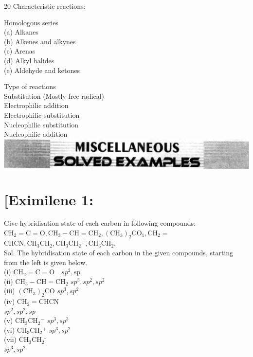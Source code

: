 \documentclass[10pt]{article}
\begin{document}
20 Characteristic reactions:

Homologous series\\
(a) Alkanes\\
(b) Alkenes and alkynes\\
(c) Arenas\\
(d) Alkyl halides\\
(e) Aldehyde and ketones

Type of reactions\\
Substitution (Mostly free radical)\\
Electrophilic addition\\
Electrophilic substitution\\
Nucleophilic substitution\\
Nucleophilic addition\\
\includegraphics[max width=\textwidth, center]{2025_01_28_8470952b98110cec3aabg-114(2)}

\section*{[Eximilene 1:}
Give hybridisation state of each carbon in following compounds: $\mathrm{CH}_{2}=\mathrm{C}=\mathrm{O}, \mathrm{CH}_{3}-\mathrm{CH}=\mathrm{CH}_{2},\left(\mathrm{CH}_{3}\right)_{2} \mathrm{CO}_{1}, \mathrm{CH}_{2}=$ $\mathrm{CHCN}, \mathrm{CH}_{3} \mathrm{CH}_{2}, \mathrm{CH}_{3} \mathrm{CH}_{2}{ }^{+}, \mathrm{CH}_{3} \mathrm{CH}_{2}$.\\
Sol. The hybridisation state of each carbon in the given compounds, starting from the left is given below.\\
(i) $\mathrm{CH}_{2}=\mathrm{C}=\mathrm{O} \quad s p^{2}, \mathrm{sp}$\\
(ii) $\mathrm{CH}_{3}-\mathrm{CH}=\mathrm{CH}_{2}$ $s p^{3}, s p^{2}, s p^{2}$\\
(iii) $\left(\mathrm{CH}_{3}\right)_{2} \mathrm{CO}$ $s p^{3}, s p^{2}$\\
(iv) $\mathrm{CH}_{2}=\mathrm{CHCN}$\\
$s p^{2}, s p^{2}, s p$\\
(v) $\mathrm{CH}_{3} \mathrm{CH}_{2}{ }^{-}$ $s p^{3}, s p^{3}$\\
(vi) $\mathrm{CH}_{3} \mathrm{CH}_{2}{ }^{+}$ $s p^{3}, s p^{2}$\\
(vii) $\mathrm{CH}_{3} \mathrm{CH}_{2}{ }^{\text {- }}$\\
$s p^{3}, s p^{2}$
\end{document}
